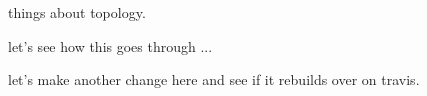things about topology.

let's see how this goes through ...

let's make another change here and see if it rebuilds over on travis.